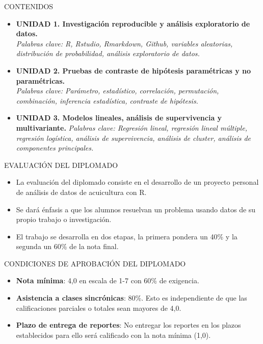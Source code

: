 \documentclass[
  ignorenonframetext,
]{beamer}
\begin{document}
\begin{frame}{CONTENIDOS}
\protect\hypertarget{contenidos}{}

\begin{itemize}
\item
  \textbf{UNIDAD 1. Investigación reproducible y análisis exploratorio
  de datos.}\\
  \emph{Palabras clave: R, Rstudio, Rmarkdown, Github, variables
  aleatorias, distribución de probabilidad, análisis exploratorio de
  datos.}
\item
  \textbf{UNIDAD 2. Pruebas de contraste de hipótesis paramétricas y no
  paramétricas.}\\
  \emph{Palabras clave: Parámetro, estadístico, correlación,
  permutación, combinación, inferencia estadística, contraste de
  hipótesis.}
\item
  \textbf{UNIDAD 3. Modelos lineales, análisis de supervivencia y
  multivariante. } \emph{Palabras clave: Regresión lineal, regresión
  lineal múltiple, regresión logística, análisis de supervivencia,
  análisis de cluster, análisis de componentes principales.}
\end{itemize}

\end{frame}

\begin{frame}{EVALUACIÓN DEL DIPLOMADO}
\protect\hypertarget{evaluaciuxf3n-del-diplomado}{}

\begin{itemize}
\item
  La evaluación del diplomado consiste en el desarrollo de un proyecto
  personal de análisis de datos de acuicultura con R.
\item
  Se dará énfasis a que los alumnos resuelvan un problema usando datos
  de su propio trabajo o investigación.
\item
  El trabajo se desarrolla en dos etapas, la primera pondera un 40\% y
  la segunda un 60\% de la nota final.
\end{itemize}

\end{frame}

\begin{frame}{CONDICIONES DE APROBACIÓN DEL DIPLOMADO}
\protect\hypertarget{condiciones-de-aprobaciuxf3n-del-diplomado}{}

\begin{itemize}
\item
  \textbf{Nota mínima}: 4,0 en escala de 1-7 con 60\% de exigencia.
\item
  \textbf{Asistencia a clases sincrónicas}: 80\%. Esto es independiente
  de que las calificaciones parciales o totales sean mayores de 4,0.
\item
  \textbf{Plazo de entrega de reportes}: No entregar los reportes en los
  plazos establecidos para ello será calificado con la nota mínima
  (1,0).
\end{itemize}

\end{frame}
\end{document}
